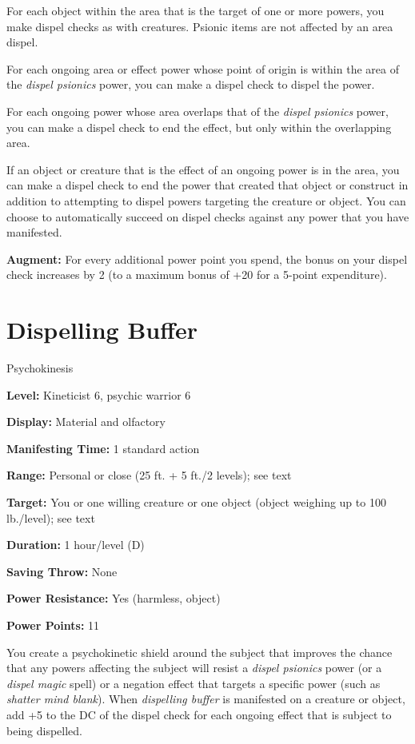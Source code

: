 \documentclass{article}
\begin{document}
For each object within the area that is the target of one or more powers, you make 
dispel checks as with creatures. Psionic items are not affected by an area dispel.

For each ongoing area or effect power whose point of origin is within the area 
of the \textit{dispel psionics }power, you can make a dispel check to dispel the 
power.

For each ongoing power whose area overlaps that of the \textit{dispel psionics 
}power, you can make a dispel check to end the effect, but only within the overlapping 
area.

If an object or creature that is the effect of an ongoing power is in the area, 
you can make a dispel check to end the power that created that object or construct 
in addition to attempting to dispel powers targeting the creature or object. You 
can choose to automatically succeed on dispel checks against any power that you 
have manifested.

\textbf{Augment:} For every additional power point you spend, the bonus on your 
dispel check increases by 2 (to a maximum bonus of +20 for a 5-point expenditure).

\vspace{12pt}
\section*{Dispelling Buffer}

Psychokinesis

\textbf{Level:} Kineticist 6, psychic warrior 6

\textbf{Display:} Material and olfactory

\textbf{Manifesting Time:} 1 standard action

\textbf{Range:} Personal or close (25 ft. + 5 ft./2 levels); see text

\textbf{Target:} You or one willing creature or one object (object weighing up 
to 100 lb./level); see text

\textbf{Duration:} 1 hour/level (D)

\textbf{Saving Throw:} None 

\textbf{Power Resistance:} Yes (harmless, object)

\textbf{Power Points:} 11

You create a psychokinetic shield around the subject that improves the chance that 
any powers affecting the subject will resist a \textit{dispel psionics }power (or 
a \textit{dispel magic }spell) or a negation effect that targets a specific power 
(such as \textit{shatter mind blank}). When \textit{dispelling buffer }is manifested 
on a creature or object, add +5 to the DC of the dispel check for each ongoing 
effect that is subject to being dispelled.
\end{document}
